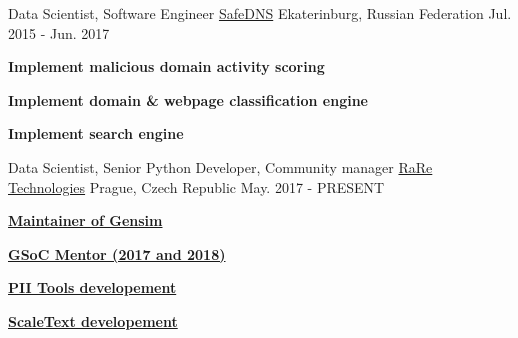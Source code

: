 


\begin{cventries}


\cventry
{Data Scientist, Software Engineer} %
{\href{https://www.safedns.com/en/}{SafeDNS}} %
{Ekaterinburg, Russian Federation} %
{Jul. 2015 - Jun. 2017} %
{ %
\begin{cvitems}
\item {\textbf{Implement malicious domain activity scoring}}
\item {\textbf{Implement domain \& webpage classification engine}}
\item {\textbf{Implement search engine}}
\end{cvitems}
}

\cventry
{Data Scientist, Senior Python Developer, Community manager} %
{\href{https://rare-technologies.com/}{RaRe Technologies}} %
{Prague, Czech Republic} %
{May. 2017 - PRESENT}
{
\begin{cvitems}
\item {\textbf{\href{https://github.com/RaRe-Technologies/gensim}{Maintainer of Gensim}}}
\item {\textbf{\href{https://summerofcode.withgoogle.com/}{GSoC Mentor (2017 and 2018)}}}
\item {\textbf{\href{https://pii-tools.com/}{PII Tools developement}}}
\item {\textbf{\href{https://scaletext.com/}{ScaleText developement}}}
\end{cvitems}
}


\end{cventries}